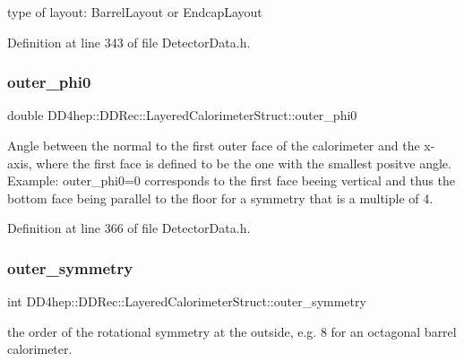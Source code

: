 type of layout\+: Barrel\+Layout or Endcap\+Layout 



Definition at line 343 of file Detector\+Data.\+h.

\hypertarget{struct_d_d4hep_1_1_d_d_rec_1_1_layered_calorimeter_struct_a4fa8650165dff7097401fa4a6de40f89}{}\label{struct_d_d4hep_1_1_d_d_rec_1_1_layered_calorimeter_struct_a4fa8650165dff7097401fa4a6de40f89} 
\subsubsection{\texorpdfstring{outer\+\_\+phi0}{outer\_phi0}}
{\footnotesize\ttfamily double D\+D4hep\+::\+D\+D\+Rec\+::\+Layered\+Calorimeter\+Struct\+::outer\+\_\+phi0}

Angle between the normal to the first outer face of the calorimeter and the x-\/axis, where the first face is defined to be the one with the smallest positve angle. Example\+: outer\+\_\+phi0=0 corresponds to the first face beeing vertical and thus the bottom face being parallel to the floor for a symmetry that is a multiple of 4. 

Definition at line 366 of file Detector\+Data.\+h.

\hypertarget{struct_d_d4hep_1_1_d_d_rec_1_1_layered_calorimeter_struct_a6adea28c87118351ef0854a54ed106b5}{}\label{struct_d_d4hep_1_1_d_d_rec_1_1_layered_calorimeter_struct_a6adea28c87118351ef0854a54ed106b5} 
\subsubsection{\texorpdfstring{outer\+\_\+symmetry}{outer\_symmetry}}
{\footnotesize\ttfamily int D\+D4hep\+::\+D\+D\+Rec\+::\+Layered\+Calorimeter\+Struct\+::outer\+\_\+symmetry}

the order of the rotational symmetry at the outside, e.\+g. 8 for an octagonal barrel calorimeter. 

